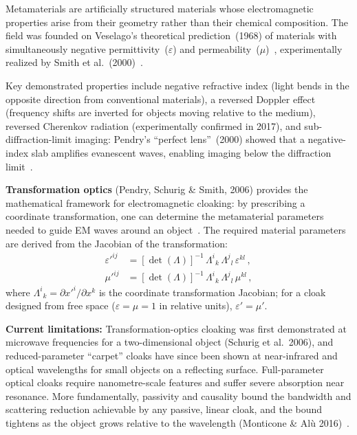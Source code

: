 \documentclass[aps,prd,twocolumn,superscriptaddress,nofootinbib,floatfix]{revtex4-2}
\begin{document}
Metamaterials are artificially structured materials whose electromagnetic
properties arise from their geometry rather than their chemical composition. The
field was founded on Veselago's theoretical prediction~(1968) of materials with
simultaneously negative permittivity~($\varepsilon$) and
permeability~($\mu$)~\cite{Veselago1968}, experimentally realized by Smith et
al.~(2000)~\cite{Smith2000}.

Key demonstrated properties include negative refractive index (light bends in the
opposite direction from conventional materials), a reversed Doppler effect
(frequency shifts are inverted for objects moving relative to the medium),
reversed Cherenkov radiation (experimentally confirmed in 2017), and
sub-diffraction-limit imaging: Pendry's ``perfect lens''~(2000) showed that a
negative-index slab amplifies evanescent waves, enabling imaging below the
diffraction limit~\cite{Pendry2000}.

\textbf{Transformation optics} (Pendry, Schurig \& Smith, 2006) provides the
mathematical framework for electromagnetic cloaking: by prescribing a coordinate
transformation, one can determine the metamaterial parameters needed to guide EM
waves around an object~\cite{PendrySchurig2006}. The required material parameters
are derived from the Jacobian of the transformation:
\begin{equation}\label{eq:transformation-optics}
\begin{aligned}
  \varepsilon'^{ij} &= [\det(\Lambda)]^{-1}\,
    \Lambda^{i}{}_{k}\,\Lambda^{j}{}_{l}\,\varepsilon^{kl}\,,\\
  \mu'^{ij} &= [\det(\Lambda)]^{-1}\,
    \Lambda^{i}{}_{k}\,\Lambda^{j}{}_{l}\,\mu^{kl}\,,
\end{aligned}
\end{equation}
where $\Lambda^{i}{}_{k} = \partial x'^{i}/\partial x^{k}$ is the coordinate
transformation Jacobian; for a cloak designed from free space
($\varepsilon=\mu=1$ in relative units), $\varepsilon'=\mu'$.

\textbf{Current limitations:} Transformation-optics cloaking was first
demonstrated at microwave frequencies for a two-dimensional object (Schurig et
al.\ 2006), and reduced-parameter ``carpet'' cloaks have since been shown at
near-infrared and optical wavelengths for small objects on a reflecting surface.
Full-parameter optical cloaks require nanometre-scale features and suffer severe
absorption near resonance. More fundamentally, passivity and causality bound the
bandwidth and scattering reduction achievable by any passive, linear cloak, and
the bound tightens as the object grows relative to the wavelength (Monticone \&
Al\`u
2016)~\cite{Shelby2001,PendrySchurig2006,DIRD_Shvets,Schurig2006,MonticoneAlu2016}.
\end{document}
